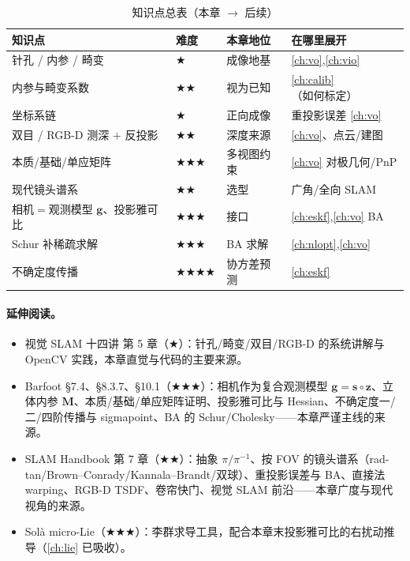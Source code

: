 \begin{table}[H]\centering\small
\caption{知识点总表（本章 $\to$ 后续）}
\begin{tabular}{llll}
\toprule
知识点 & 难度 & 本章地位 & 在哪里展开 \\
\midrule
针孔 / 内参 / 畸变 & $\bigstar$ & 成像地基 & \cref{ch:vo},\cref{ch:vio} \\
内参与畸变系数 & $\bigstar\bigstar$ & 视为已知 & \cref{ch:calib}（如何标定） \\
坐标系链 & $\bigstar$ & 正向成像 & 重投影误差 \cref{ch:vo} \\
双目 / RGB-D 测深 $+$ 反投影 & $\bigstar\bigstar$ & 深度来源 & \cref{ch:vo}、点云/建图 \\
本质/基础/单应矩阵 & $\bigstar\bigstar\bigstar$ & 多视图约束 & \cref{ch:vo} 对极几何/PnP \\
现代镜头谱系 & $\bigstar\bigstar$ & 选型 & 广角/全向 SLAM \\
相机$=$观测模型 $\mathbf{g}$、投影雅可比 & $\bigstar\bigstar\bigstar$ & 接口 & \cref{ch:eskf},\cref{ch:vo} BA \\
Schur 补稀疏求解 & $\bigstar\bigstar\bigstar$ & BA 求解 & \cref{ch:nlopt},\cref{ch:vo} \\
不确定度传播 & $\bigstar\bigstar\bigstar\bigstar$ & 协方差预测 & \cref{ch:eskf} \\
\bottomrule
\end{tabular}
\end{table}

\paragraph{延伸阅读。}
\begin{itemize}
  \item 视觉 SLAM 十四讲\cite{gaoxiang2019slam14} 第 5 章（$\bigstar$）：针孔/畸变/双目/RGB-D 的系统讲解与 OpenCV 实践，本章直觉与代码的主要来源。
  \item Barfoot\cite{barfoot2024state} §7.4、§8.3.7、§10.1（$\bigstar\bigstar\bigstar$）：相机作为复合观测模型 $\mathbf{g}=\mathbf{s}\circ\mathbf{z}$、立体内参 $\mathbf{M}$、本质/基础/单应矩阵证明、投影雅可比与 Hessian、不确定度一/二/四阶传播与 sigmapoint、BA 的 Schur/Cholesky——本章严谨主线的来源。
  \item SLAM Handbook\cite{carlone2026handbook} 第 7 章（$\bigstar\bigstar$）：抽象 $\pi/\pi^{-1}$、按 FOV 的镜头谱系（rad-tan/Brown--Conrady/Kannala--Brandt/双球）、重投影误差与 BA、直接法 warping、RGB-D TSDF、卷帘快门、视觉 SLAM 前沿——本章广度与现代视角的来源。
  \item Solà micro-Lie\cite{sola2018micro}（$\bigstar\bigstar\bigstar$）：李群求导工具，配合本章末投影雅可比的右扰动推导（\cref{ch:lie} 已吸收）。
\end{itemize}

